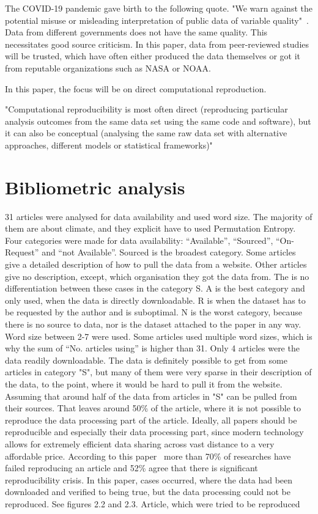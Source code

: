 The COVID-19 pandemic gave birth to the following quote. "We warn against the potential misuse or misleading interpretation of public data of variable quality"~\cite{Struelens2021}. Data from different governments does not have the same quality. This necessitates good source criticism. In this paper, data from peer-reviewed studies will be trusted, which have often either produced the data themselves or got it from reputable organizations such as NASA or NOAA. 

In this paper, the focus will be on direct computational reproduction.

"Computational reproducibility is most often direct (reproducing particular analysis outcomes from the same data set using the same code and software), but it can also be conceptual (analysing the same raw data set with alternative approaches, different models or statistical frameworks)"~\cite{Fidler2018}

\section{Bibliometric analysis}
31 articles were analysed for data availability and used word size. The majority of them are about climate, and they explicit have to used Permutation Entropy. Four categories were made for data availability: “Available”, “Sourced”, “On-Request” and “not Available”. Sourced is the broadest category. Some articles give a detailed description of how to pull the data from a website. Other articles give no description, except, which organisation they got the data from. The is no differentiation between these cases in the category S. A is the best category and only used, when the data is directly downloadable. R is when the dataset has to be requested by the author and is suboptimal. N is the worst category, because there is no source to data, nor is the dataset attached to the paper in any way. Word size between 2-7 were used. Some articles used multiple word sizes, which is why the sum of “No. articles using” is higher than 31. Only 4 articles were the data readily downloadable. The data is definitely possible to get from some articles in category "S", but many of them were very sparse in their description of the data, to the point, where it would be hard to pull it from the website. Assuming that around half of the data from articles in "S" can be pulled from their sources. That leaves around 50\% of the article, where it is not possible to reproduce the data processing part of the article. Ideally, all papers should be reproducible and especially their data processing part, since modern technology allows for extremely efficient data sharing across vast distance to a very affordable price. According to this paper~\cite{Baker2016} more than 70\% of researches have failed reproducing an article and 52\% agree that there is significant reproducibility crisis. In this paper, cases occurred, where the data had been downloaded and verified to being true, but the data processing could not be reproduced. See figures 2.2 and 2.3. Article, which were tried to be reproduced~\cite{Saco2010}


